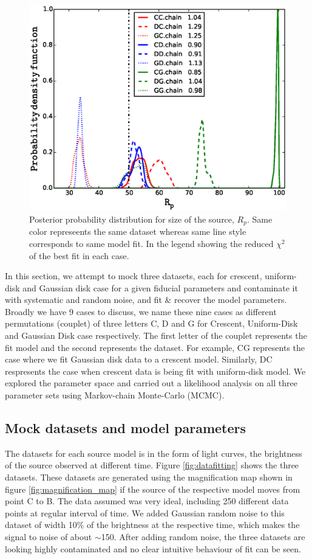 \begin{figure}
\centering
  \includegraphics[width=0.9\hsize]{plots/Rp4all.eps}
\caption{\label{fig:mcmc} Posterior probability distribution for size
  of the source, $R_p$. Same color represeents the same dataset
  whereas same line style corresponds to same model fit. In the legend
  showing the reduced $\chi^2$ of the best fit in each case.}
\end{figure}


In this section, we attempt to mock three datasets, each for crescent, uniform-disk and Gaussian disk case for a given fiducial parameters and contaminate it with systematic and random noise, and fit \& recover the model parameters. Broadly we have 9 cases to discuss, we name these nine cases as different permutations (couplet) of three letters C, D and G for Crescent, Uniform-Disk and Gaussian Disk case respectively. The first letter of the couplet represents the fit model and the second represents the dataset. For example, CG represents the case where we fit Gaussian disk data to a crescent model. Similarly, DC respresents the case when crescent data is being fit with uniform-disk model. We explored the parameter space and carried out a likelihood analysis on all three parameter sets using Markov-chain Monte-Carlo (MCMC).

\subsection{Mock datasets and model parameters}
The datasets for each source model is in the form of light curves, the brightness of the source observed at different time. Figure \ref{fig:datafitting} shows the three datasets. These datasets are generated using the magnification map shown in figure \ref{fig:magnification_map} if the source of the respective model moves from point C to B. The data assumed was very  ideal, including 250 different data points at regular interval of time. We added Gaussian random noise to this dataset of width 10\% of the brightness at the respective time, which makes the signal to noise of about $\sim$150. After adding random noise, the three datasets are looking highly contaminated and no clear intuitive behaviour of fit can be seen. 

